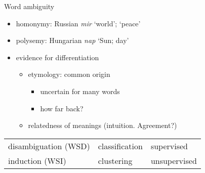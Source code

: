 \documentclass[10pt]{beamer}%
\begin{document}
\begin{frame}{Word ambiguity}
  \begin{itemize}
    \item homonymy: Russian \emph{mir} `world'; `peace'
    \item polysemy: Hungarian \emph{nap} `Sun; day'
    \item evidence for differentiation
      \begin{itemize}
        \item etymology: common origin
          \begin{itemize}
            \item uncertain for many words
            \item how far back?
          \end{itemize}
        \item relatedness of meanings (intuition. Agreement?)
      \end{itemize}
  \end{itemize}
  \bigskip
  \begin{tabular} {lll}
    \toprule
    disambiguation (WSD) & classification & supervised \\
    induction (WSI) \citep{Schutze:1998} & clustering & unsupervised \\
    \bottomrule
  \end{tabular}
\end{frame}
\end{document}
